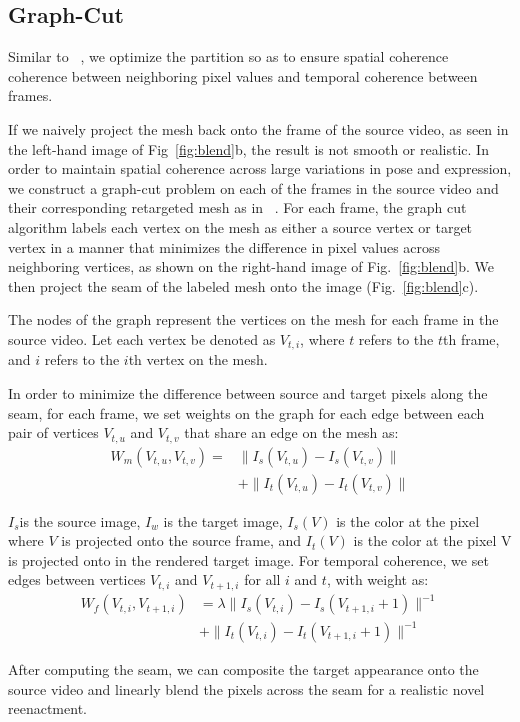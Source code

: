\subsection{Graph-Cut}
Similar to ~\cite{replace}, 
we optimize the partition so as to ensure spatial coherence coherence between neighboring pixel values
and temporal coherence between frames. 


If we naively project the mesh back onto the frame of the source video, as seen in the left-hand image of Fig~\ref{fig:blend}b, the result is not smooth or realistic. 
In order to maintain spatial coherence across large variations in pose and expression, 
 we construct a graph-cut problem on each of the frames in the source video and their corresponding retargeted mesh as in ~\cite{graphcut}. For each frame, the graph cut algorithm labels each vertex on the mesh as either a source vertex or target vertex in a manner that minimizes the difference in pixel values across neighboring vertices, as shown on the right-hand image of Fig.~\ref{fig:blend}b. We then project the seam of the labeled mesh onto the image (Fig.~\ref{fig:blend}c). 

The nodes of the graph represent the vertices on the mesh for each frame in the source video. 
Let each vertex be denoted as $V_{t,i}$, where $t$ refers to the $t$th frame, and $i$ refers to the $i$th vertex on the mesh. 

In order to minimize the difference between source and target pixels along the seam, for each frame, we set weights on the graph for each edge between each pair of vertices $V_{t,u}$ and  $V_{t,v}$ that share an edge on the mesh as:
\begin{equation}
\begin{split}
W_m(V_{t,u}, V_{t,v}) = & \|I_{s}(V_{t,u})-I_{s}(V_{t,v})\|\\
& + \|I_{t}(V_{t,u})-I_{t}(V_{t, v})\| 
\end{split}
\end{equation}

 $I_{s}$is the source image, $I_{w}$ is the target image, $I_{s}(V)$ is the color at the pixel where $V$ is projected onto the source frame, and $I_{t}(V)$ is the color at the pixel V is projected onto in the rendered target image.
 For temporal coherence, we set edges between vertices $V_{t,i}$ and $V_{t+1,i}$ for all $i$ and $t$, with weight as:
\begin{equation}
\begin{split}
W_f(V_{t,i}, V_{t+1,i})& = \lambda \|I_{s}(V_{t,i})-I_{s}(V_{t+1,i} +1)\|^{-1}\\
              & + \|I_{t}(V_{t,i})-I_{t}(V_{t+1,i} + 1)\|^{-1}
\end{split}
\end{equation}

After computing the seam, we can composite the target appearance onto the source video and linearly blend the pixels across the seam for a realistic novel reenactment.  





